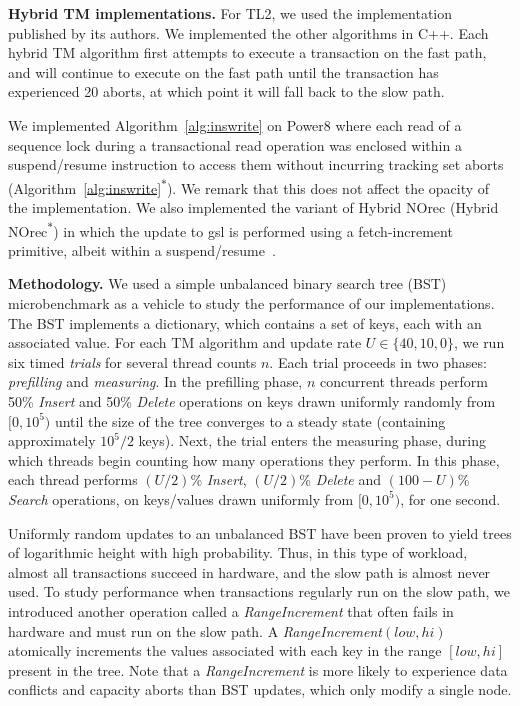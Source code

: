 \vspace{1mm}\noindent\textbf{Hybrid TM implementations.}
For TL2, we used the implementation published by its authors.
We implemented the other algorithms in C++.
Each hybrid TM algorithm first attempts to execute a transaction on the fast path, and will continue to execute on the fast path until the transaction has experienced 20 aborts, at which point it will fall back to the slow path.

We implemented Algorithm~\ref{alg:inswrite} on Power8 where each read of a sequence lock during a transactional read operation was enclosed within a suspend/resume instruction to access them without 
incurring tracking set aborts (Algorithm~\ref{alg:inswrite}\textsuperscript{$\ast$}). We remark that this does not affect the opacity of the implementation. 
We also implemented the variant of Hybrid NOrec (Hybrid NOrec\textsuperscript{$\ast$}) in which the update to gsl is performed using a fetch-increment primitive, albeit within a suspend/resume~\cite{hynorecriegel}. 

\vspace{1mm}\noindent\textbf{Methodology.}
We used a simple unbalanced binary search tree (BST) microbenchmark as a vehicle to study the performance of our implementations.
The BST implements a dictionary, which contains a set of keys, each with an associated value.
For each TM algorithm %
and update rate $U \in \{40, 10, 0\}$, we run six timed \textit{trials} for several thread counts $n$.
Each trial proceeds in two phases: \textit{prefilling} and \textit{measuring}.
In the prefilling phase, $n$ concurrent threads perform 50\% \textit{Insert} and 50\% \textit{Delete} operations on keys drawn uniformly randomly from $[0, 10^5)$ until the size of the tree converges to a steady state (containing approximately $10^5/2$ keys).
Next, the trial enters the measuring phase, during which threads begin counting how many operations they perform.
In this phase, each thread performs $(U/2)$\% \textit{Insert}, $(U/2)$\% \textit{Delete} and $(100-U)$\% \textit{Search} operations, on keys/values drawn uniformly from $[0,10^5)$, for one second.

Uniformly random updates to an unbalanced BST have been proven to yield trees of logarithmic height with high probability.
Thus, in this type of workload, almost all transactions succeed in hardware, and the slow path is almost never used.
To study performance when transactions regularly run on the slow path, we introduced another operation called a \textit{RangeIncrement} that often fails in hardware and must run on the slow path.
A \textit{RangeIncrement}$(low, hi)$ atomically increments the values 
associated with each key in the range $[low, hi]$ present in the tree.
Note that a \textit{RangeIncrement} is more likely to experience data 
conflicts and capacity aborts than BST updates, which only modify a single node.

